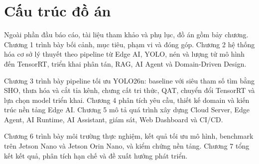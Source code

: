 \section{Cấu trúc đồ án}

Ngoài phần đầu báo cáo, tài liệu tham khảo và phụ lục, đồ án gồm bảy chương.
Chương 1 trình bày bối cảnh, mục tiêu, phạm vi và đóng góp. Chương 2 hệ thống
hóa cơ sở lý thuyết theo pipeline từ Edge AI, YOLO, nén và lượng tử mô hình đến
TensorRT, triển khai phân tán, RAG, AI Agent và Domain-Driven Design.

Chương 3 trình bày pipeline tối ưu YOLO26n: baseline với siêu tham số tìm bằng
SHO, thưa hóa và cắt tỉa kênh, chưng cất tri thức, QAT, chuyển đổi TensorRT và
lựa chọn model triển khai. Chương 4 phân tích yêu cầu, thiết kế domain và kiến
trúc nền tảng Edge AI. Chương 5 mô tả quá trình xây dựng Cloud Server, Edge Agent,
AI Runtime, AI Assistant, giám sát, Web Dashboard và CI/CD.

Chương 6 trình bày môi trường thực nghiệm, kết quả tối ưu mô hình, benchmark
trên Jetson Nano và Jetson Orin Nano, và kiểm chứng nền tảng. Chương 7 tổng
kết kết quả, phân tích hạn chế và đề xuất hướng phát triển.